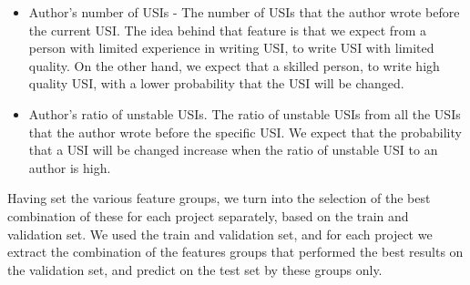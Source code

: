 \begin{itemize}
    \item Author's number of USIs - The number of USIs that the author wrote before the current USI. The idea behind that feature is that we expect from a person with limited experience in writing USI, to write USI with limited quality. On the other hand, we expect that a skilled person, to write high quality USI, with a lower probability that the USI will be changed.
    \item Author's ratio of unstable USIs. The ratio of unstable USIs from all the USIs that the author wrote before the specific USI. We expect that the probability that a USI will be changed increase when the ratio of unstable USI to an author is high.
\end{itemize}



Having set the various feature groups, we turn into the selection of the best combination of these for each project separately, based on the train and validation set. 
We used the train and validation set, and for each project we extract the combination of the features groups that performed the best results on the validation set, and predict on the test set by these groups only. 



